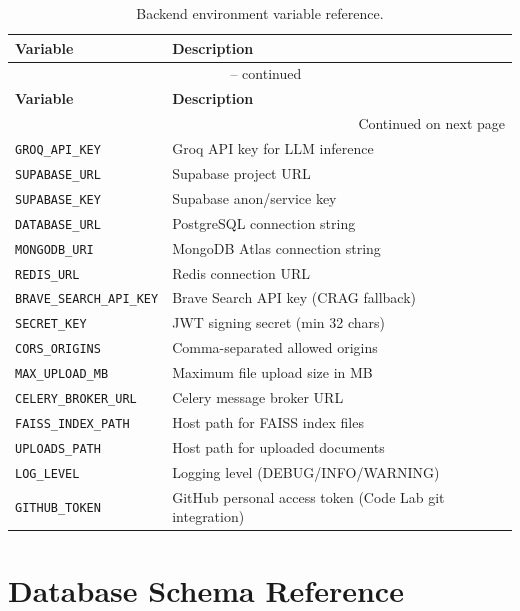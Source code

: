 \begin{longtable}{p{5cm} p{5.5cm}}
    \caption{Backend environment variable reference.} \label{tab:env-vars} \\
    \toprule
    \textbf{Variable} & \textbf{Description} \\
    \midrule
    \endfirsthead
    \multicolumn{2}{c}{\tablename\ \thetable{} -- continued} \\
    \toprule
    \textbf{Variable} & \textbf{Description} \\
    \midrule
    \endhead
    \midrule \multicolumn{2}{r}{Continued on next page} \\
    \endfoot
    \bottomrule
    \endlastfoot
    \texttt{GROQ\_API\_KEY}         & Groq API key for LLM inference \\
    \texttt{SUPABASE\_URL}          & Supabase project URL \\
    \texttt{SUPABASE\_KEY}          & Supabase anon/service key \\
    \texttt{DATABASE\_URL}          & PostgreSQL connection string \\
    \texttt{MONGODB\_URI}           & MongoDB Atlas connection string \\
    \texttt{REDIS\_URL}             & Redis connection URL \\
    \texttt{BRAVE\_SEARCH\_API\_KEY} & Brave Search API key (CRAG fallback) \\
    \texttt{SECRET\_KEY}            & JWT signing secret (min 32 chars) \\
    \texttt{CORS\_ORIGINS}          & Comma-separated allowed origins \\
    \texttt{MAX\_UPLOAD\_MB}        & Maximum file upload size in MB \\
    \texttt{CELERY\_BROKER\_URL}    & Celery message broker URL \\
    \texttt{FAISS\_INDEX\_PATH}     & Host path for FAISS index files \\
    \texttt{UPLOADS\_PATH}          & Host path for uploaded documents \\
    \texttt{LOG\_LEVEL}             & Logging level (DEBUG/INFO/WARNING) \\
    \texttt{GITHUB\_TOKEN}          & GitHub personal access token (Code Lab git integration) \\
\end{longtable}

\section{Database Schema Reference}
\label{sec:db-schema}

